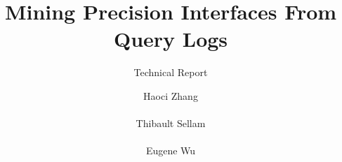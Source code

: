 \documentclass{sig-alternate}
\begin{document}
\title{Mining Precision Interfaces From Query Logs}
\subtitle{Technical Report}
\author{
\alignauthor
Haoci Zhang\\
       \\
\alignauthor
Thibault Sellam\\
       \\
\alignauthor
Eugene Wu\\
       \\
}

\maketitle

\begin{abstract}
  
\end{abstract}








% 




{\small


\balance
}

%
\end{document}
